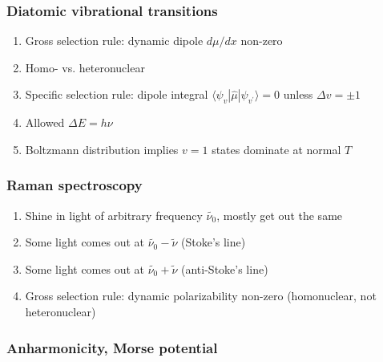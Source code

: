 \documentclass[11pt]{article}
\begin{document}
\subsubsection{Diatomic vibrational transitions}
\label{sec:orgee96591}
\begin{enumerate}
\item Gross selection rule: dynamic dipole \(d\mu/dx\) non-zero
\item Homo- vs. heteronuclear
\item Specific selection rule: dipole integral \(\langle \psi_v|\hat\mu|\psi_{v^\prime} \rangle =0\)
unless \(\Delta v = \pm 1\)
\item Allowed \(\Delta E = h\nu\)
\item Boltzmann distribution implies \(v=1\) states dominate at normal \(T\)
\end{enumerate}
\subsubsection{Raman spectroscopy}
\label{sec:org44a9946}
\begin{enumerate}
\item Shine in light of arbitrary frequency \(\tilde{\nu_0}\), mostly get out the same
\item Some light comes out at \(\tilde{\nu_0}-\tilde{\nu}\) (Stoke's line)
\item Some light comes out at \(\tilde{\nu_0}+\tilde{\nu}\) (anti-Stoke's line)
\item Gross selection rule: dynamic polarizability non-zero (homonuclear, not heteronuclear)
\end{enumerate}
\subsubsection{Anharmonicity, Morse potential}
\label{sec:org0fee52c}
\end{document}
